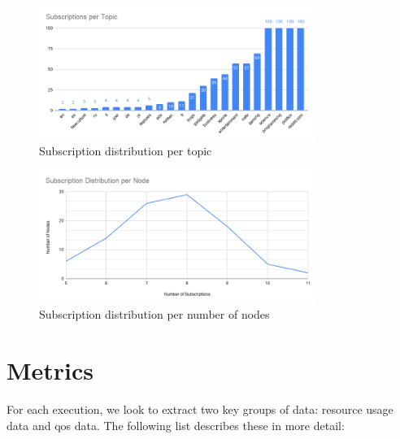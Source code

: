 \begin{figure}[!htb]
  \centering
  \includegraphics[width=0.8\textwidth]{img/subscriptions-per-topic.png}
  \caption{Subscription distribution per topic}
  \label{fig:subscriptions-per-topic}
\end{figure}

\begin{figure}[!htb]
  \centering
  \includegraphics[width=0.8\textwidth]{img/subscription-distribution-per-node.png}
  \caption{Subscription distribution per number of nodes}
  \label{fig:subscription-distribution-per-node}
\end{figure}

\section{Metrics}\label{metrics}

For each execution, we look to extract two key groups of data: resource usage
data and \acrshort{qos} data. The following list describes these in more detail:

